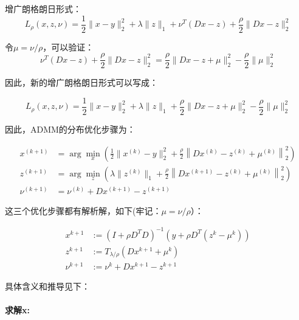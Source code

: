 \documentclass[10pt]{report}
\begin{document}
增广朗格朗日形式：
\begin{equation}
L_{\rho}( x , z , \nu )= \frac{1}{2}\|x-y\|_{2}^{2} + \lambda\|z\|_{1}+ \nu ^{ T }(Dx-z)+\frac{\rho}{2}\|Dx-z\|_{2}^{2}
\label{eq-3}
\end{equation}

令$\mu = \nu / \rho$，可以验证：
\begin{equation}
\nu ^{ T }(Dx-z)+\frac{\rho}{2}\| Dx-z\|_{2}^{2}= \frac{\rho}{2}\|Dx-z+ \mu \|_{2}^{2}-\frac{\rho}{2}\| \mu \|_{2}^{2}
\label{eq-sub-aug}
\end{equation}

因此，新的增广朗格朗日形式可以写成：

\begin{equation}
L_{\rho}( x , z , \nu )= \frac{1}{2}\|x-y\|_{2}^{2} + \lambda\|z\|_{1}+ \frac{\rho}{2}\|Dx-z+ \mu \|_{2}^{2}-\frac{\rho}{2}\| \mu \|_{2}^{2}
\end{equation}

因此，ADMM的分布优化步骤为：

\begin{equation}
\begin{aligned}
x ^{(k+1)} &=\arg \min _{ x }\left(\frac{1}{2} \|x^{(k)}-y\|_{2}^{2}+\frac{\rho}{2}\left\| Dx^{(k)}-z ^{(k)}+ \mu ^{(k)}\right\|_{2}^{2}\right) \\
z ^{(k+1)} &=\arg \min _{ z }\left(\lambda\|z^{(k)}\|_{1}+\frac{\rho}{2}\left\| Dx ^{(k+1)}- z^{(k)} + \mu ^{(k)}\right\|_{2}^{2}\right) \\
\nu ^{(k+1)} &= \nu ^{(k)}+ Dx ^{(k+1)}- z ^{(k+1)}
\end{aligned}
\label{eq-6}
\end{equation}

这三个优化步骤都有解析解，如下(牢记：$\mu = \nu / \rho$）：

\begin{equation}
\begin{aligned}
x^{k+1} &:=\left(I+\rho D^{T} D\right)^{-1}\left(y+\rho D^{T}\left(z^{k}-\mu^{k}\right)\right) \\
z^{k+1} &:=T_{\lambda / \rho}\left(D x^{k+1}+\mu^{k}\right) \\
\nu^{k+1} &:=\nu^{k}+D x^{k+1}-z^{k+1}
\end{aligned}
\end{equation}

具体含义和推导见下：

\paragraph{求解x: }
\end{document}

